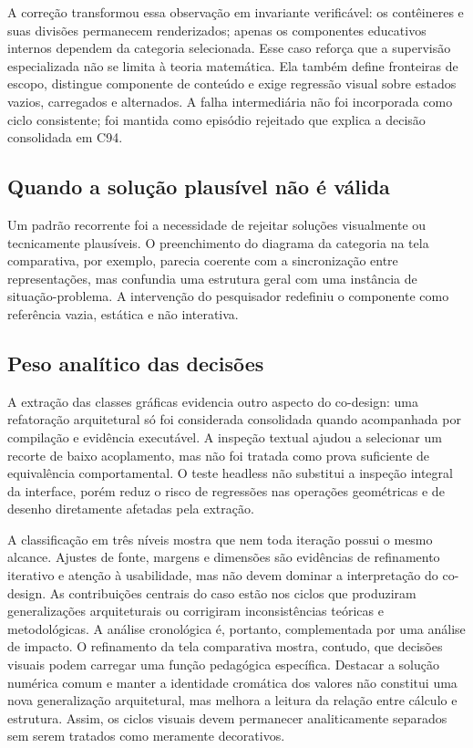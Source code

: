 \documentclass[preprint,12pt,authoryear]{elsarticle}
\begin{document}
A correção transformou essa observação em invariante verificável: os contêineres e suas divisões permanecem renderizados; apenas os componentes educativos internos dependem da categoria selecionada. Esse caso reforça que a supervisão especializada não se limita à teoria matemática. Ela também define fronteiras de escopo, distingue componente de conteúdo e exige regressão visual sobre estados vazios, carregados e alternados. A falha intermediária não foi incorporada como ciclo consistente; foi mantida como episódio rejeitado que explica a decisão consolidada em C94.

\subsection{Quando a solução plausível não é válida}
Um padrão recorrente foi a necessidade de rejeitar soluções visualmente ou tecnicamente plausíveis. O preenchimento do diagrama da categoria na tela comparativa, por exemplo, parecia coerente com a sincronização entre representações, mas confundia uma estrutura geral com uma instância de situação-problema. A intervenção do pesquisador redefiniu o componente como referência vazia, estática e não interativa.

\subsection{Peso analítico das decisões}
A extração das classes gráficas evidencia outro aspecto do co-design: uma refatoração arquitetural só foi considerada consolidada quando acompanhada por compilação e evidência executável. A inspeção textual ajudou a selecionar um recorte de baixo acoplamento, mas não foi tratada como prova suficiente de equivalência comportamental. O teste headless não substitui a inspeção integral da interface, porém reduz o risco de regressões nas operações geométricas e de desenho diretamente afetadas pela extração.

A classificação em três níveis mostra que nem toda iteração possui o mesmo alcance. Ajustes de fonte, margens e dimensões são evidências de refinamento iterativo e atenção à usabilidade, mas não devem dominar a interpretação do co-design. As contribuições centrais do caso estão nos ciclos que produziram generalizações arquiteturais ou corrigiram inconsistências teóricas e metodológicas. A análise cronológica é, portanto, complementada por uma análise de impacto.
O refinamento da tela comparativa mostra, contudo, que decisões visuais podem carregar uma função pedagógica específica. Destacar a solução numérica comum e manter a identidade cromática dos valores não constitui uma nova generalização arquitetural, mas melhora a leitura da relação entre cálculo e estrutura. Assim, os ciclos visuais devem permanecer analiticamente separados sem serem tratados como meramente decorativos.
\end{document}
